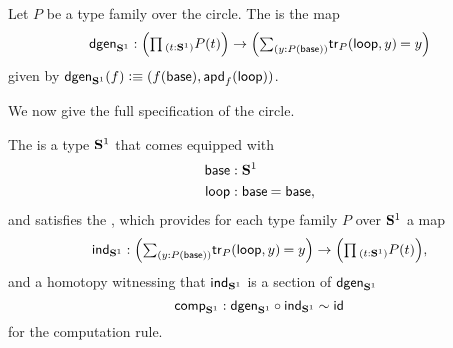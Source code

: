 \begin{defn}
Let $P$ be a type family over the circle. The  is the map
\begin{equation}\label{eq:dgen_circle}
\mathsf{dgen}_{\sphere{1}}:\Big(\prd{t:\sphere{1}}P(t)\Big)\to\Big(\sm{y:P(\base)}\id{\mathsf{tr}_P(\lloop,y)}{y}\Big)
\end{equation}
given by $\mathsf{dgen}_{\mathbf{S}^{1}}(f)\vcentcolon\equiv{\mathopen{}(f(\ensuremath{\mathsf{base}}),\ensuremath{\mathsf{apd}_{f}\mathopen{}\left(\mathsf{loop}\right)\mathclose{}})\mathclose{}}$.
\end{defn}

We now give the full specification of the circle.

\begin{defn}
The  is a type $\mathbf{S}^{1}$ that comes equipped with
\begin{align*}
\base & : \sphere{1} \\
\lloop & : \id{\base}{\base},
\end{align*}
and satisfies the , which provides for each type family $P$ over $\mathbf{S}^{1}$ a map
\begin{equation*}
\ind{\sphere{1}}:\Big(\sm{y:P(\base)}\id{\mathsf{tr}_P(\lloop,y)}{y}\Big)\to \Big(\prd{t:\sphere{1}}P(t)\Big),
\end{equation*}
and a homotopy witnessing that $\mathsf{ind}_{\mathbf{S}^{1}}$ is a section of $\mathsf{dgen}_{\mathbf{S}^{1}}$
\begin{equation*}
\mathsf{comp}_{\mathbf{S}^{1}}:\mathsf{dgen}_{\mathbf{S}^{1}}\circ \mathsf{ind}_{\mathbf{S}^{1}}\sim \mathsf{id}_{}
\end{equation*}
for the computation rule.
\end{defn}

